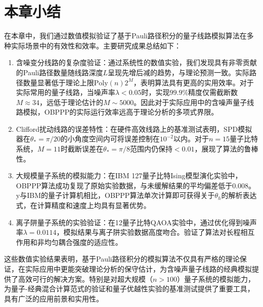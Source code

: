 \section{本章小结}

在本章中，我们通过数值模拟验证了基于Pauli路径积分的量子线路模拟算法在多种实际场景中的有效性和效率。主要研究成果总结如下：
\begin{enumerate}
    \item 含噪变分线路的复杂度验证：通过系统性的数值实验，我们发现具有非零贡献的Pauli路径数量随线路深度$L$呈现先增后减的趋势，与理论预测一致。实际路径数量显著低于理论上限$\mathrm{Poly}(n)2^M$，表明算法具有更高的实用效率。对于实际常用的量子线路，当噪声率$\lambda<0.05$时，实现$99.9\%$精度仅需截断数$M\approx34$，远低于理论估计的$M\sim5000$。因此对于实际应用中的含噪声量子线路模拟，OBPPP的实际运行效率远高于理论分析的多项式界限。
    \item Clifford扰动线路的误差特性：在硬件高效线路上的基准测试表明，SPD模拟器在$\theta_*=\pi/20$的小角度空间内可将误差控制在$10^{-2}$以内。对于$n=15$量子比特系统，$M=11$时截断误差在$\theta_*=\pi/8$范围内仍保持$<0.01$，展现了算法的鲁棒性。
    \item 大规模量子系统的模拟能力：在IBM 127量子比特Ising模型演化实验中，OBPPP算法成功复现了原始实验数据，与未缓解结果的平均偏差低于$0.008$。y与IBM的量子计算机相比，OBPPP算法单次计算即可获得关于$\theta_h$的解析表达式，在计算精度和速度上均具有显著优势。
    \item 离子阱量子系统的实验验证：在12量子比特QAOA实验中，通过优化得到噪声率$\lambda=0.0114$，模拟结果与离子阱实验数据高度吻合。验证了算法对长程相互作用和非均匀耦合强度的适应性。
\end{enumerate}


这些数值实验结果表明，基于Pauli路径积分的模拟算法不仅具有严格的理论保证，在实际应用中更能突破理论分析的保守估计，为含噪声量子线路的经典模拟提供了高效可行的解决方案。特别是对超大规模（$n>100$）量子系统的模拟能力，为量子-经典混合计算范式的验证和量子优越性实验的基准测试提供了重要工具，具有广泛的应用前景和实用性。
